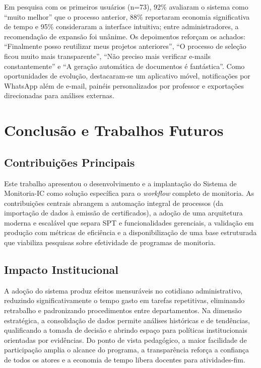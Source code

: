 \documentclass[portuguese]{sbc2025}%
\begin{document}
Em pesquisa com os primeiros usuários (n=73), 92\% avaliaram o sistema como “muito melhor” que o processo anterior, 88\% reportaram economia significativa de tempo e 95\% consideraram a interface intuitiva; entre administradores, a recomendação de expansão foi unânime. Os depoimentos reforçam os achados: “Finalmente posso reutilizar meus projetos anteriores”, “O processo de seleção ficou muito mais transparente”, “Não preciso mais verificar e-mails constantemente” e “A geração automática de documentos é fantástica”. Como oportunidades de evolução, destacaram-se um aplicativo móvel, notificações por WhatsApp além de e-mail, painéis personalizados por professor e exportações direcionadas para análises externas.

\section{Conclusão e Trabalhos Futuros}
\label{sec:conclusion}

\subsection{Contribuições Principais}

Este trabalho apresentou o desenvolvimento e a implantação do Sistema de Monitoria-IC como solução específica para o \textit{workflow} completo de monitoria. As contribuições centrais abrangem a automação integral de processos (da importação de dados à emissão de certificados), a adoção de uma arquitetura moderna e escalável que separa SPT e funcionalidades gerenciais, a validação em produção com métricas de eficiência e a disponibilização de uma base estruturada que viabiliza pesquisas sobre efetividade de programas de monitoria.

\subsection{Impacto Institucional}

A adoção do sistema produz efeitos mensuráveis no cotidiano administrativo, reduzindo significativamente o tempo gasto em tarefas repetitivas, eliminando retrabalho e padronizando procedimentos entre departamentos. Na dimensão estratégica, a consolidação de dados permite análises históricas e de tendências, qualificando a tomada de decisão e abrindo espaço para políticas institucionais orientadas por evidências. Do ponto de vista pedagógico, a maior facilidade de participação amplia o alcance do programa, a transparência reforça a confiança de todos os atores e a economia de tempo libera docentes para atividades-fim.
\end{document}
